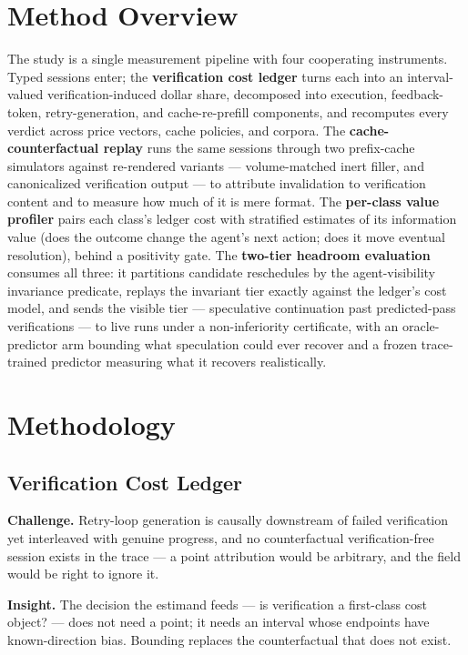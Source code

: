 \documentclass[11pt]{article}
\begin{document}
\section{Method Overview}

The study is a single measurement pipeline with four cooperating instruments. Typed sessions enter; the \textbf{verification cost ledger} turns each into an interval-valued verification-induced dollar share, decomposed into execution, feedback-token, retry-generation, and cache-re-prefill components, and recomputes every verdict across price vectors, cache policies, and corpora. The \textbf{cache-counterfactual replay} runs the same sessions through two prefix-cache simulators against re-rendered variants --- volume-matched inert filler, and canonicalized verification output --- to attribute invalidation to verification content and to measure how much of it is mere format. The \textbf{per-class value profiler} pairs each class's ledger cost with stratified estimates of its information value (does the outcome change the agent's next action; does it move eventual resolution), behind a positivity gate. The \textbf{two-tier headroom evaluation} consumes all three: it partitions candidate reschedules by the agent-visibility invariance predicate, replays the invariant tier exactly against the ledger's cost model, and sends the visible tier --- speculative continuation past predicted-pass verifications --- to live runs under a non-inferiority certificate, with an oracle-predictor arm bounding what speculation could ever recover and a frozen trace-trained predictor measuring what it recovers realistically.

\section{Methodology}

\subsection{Verification Cost Ledger}

\textbf{Challenge.} Retry-loop generation is causally downstream of failed verification yet interleaved with genuine progress, and no counterfactual verification-free session exists in the trace --- a point attribution would be arbitrary, and the field would be right to ignore it.

\textbf{Insight.} The decision the estimand feeds --- is verification a first-class cost object? --- does not need a point; it needs an interval whose endpoints have known-direction bias. Bounding replaces the counterfactual that does not exist.
\end{document}
